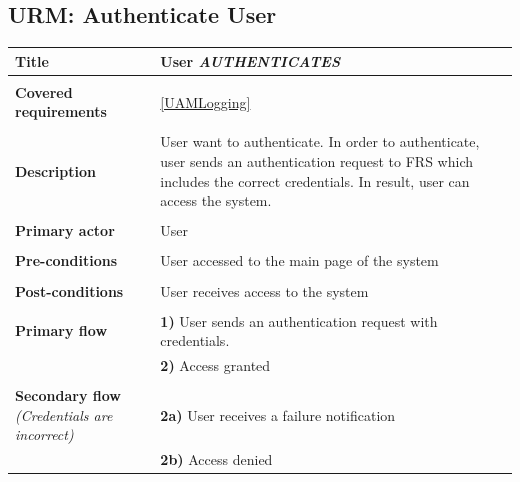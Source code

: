 \documentclass[a4paper,11pt]{article}
\begin{document}
\subsection{URM: Authenticate User}

\begin{tabular}{|p{3.5cm}|p{11.5cm}|} \hline
    \textbf{Title} &   User \emph{AUTHENTICATES}

    \\ \hline \rowcolor{Gray} & \\ \hline

    \textbf{Covered requirements} & \ref{UAMLogging}
  
    \\ \hline \rowcolor{Gray} & \\ \hline 
  
    \textbf{Description} &  User want to authenticate. In order to authenticate, user sends an authentication request to FRS which includes the correct credentials. In result, user can access the system. 
   
    \\ \hline \rowcolor{Gray} & \\ \hline 
   
    \textbf{Primary actor} & User   
   
    \\ \hline \rowcolor{Gray} & \\ \hline  
   
    \textbf{Pre-conditions} &   User accessed to the main page of the system 
   
    \\ \hline \rowcolor{Gray} & \\ \hline 
   
    \textbf{Post-conditions} &   User receives access to the system 
   
    \\ \hline \rowcolor{Gray} & \\ \hline  
    
    \textbf{Primary flow} &  
    \textbf{1)} User sends an authentication request with credentials.  \\& 
    \textbf{2)} Access granted
    
    \\ \hline \rowcolor{Gray} & \\ \hline  
    
    \textbf{Secondary flow} \emph{(Credentials are incorrect)} &  
    \textbf{2a)} User receives a failure notification \\ &
    \textbf{2b)} Access denied
    
    \\ \hline   
\end{tabular} 
\end{document}

